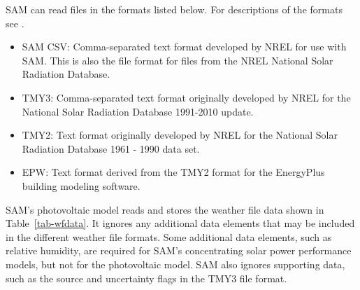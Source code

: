 \documentclass[12pt,letterpaper]{article}
\begin{document}
SAM can read files in the formats listed below. For descriptions of the formats see \citep{help-weatherfileformats}.

\begin{itemize}
\item SAM CSV: Comma-separated text format developed by NREL for use with SAM. This is also the file format for files from the NREL National Solar Radiation Database.
\item TMY3: Comma-separated text format originally developed by NREL for the National Solar Radiation Database 1991-2010 update.
\item TMY2: Text format originally developed by NREL for the National Solar Radiation Database 1961 - 1990 data set.
\item EPW: Text format derived from the TMY2 format for the EnergyPlus building modeling software. 
\end{itemize}

SAM's photovoltaic model reads and stores the weather file data shown in Table~\ref{tab-wfdata}. It ignores any additional data elements that may be included in the different weather file formats. Some additional data elements, such as relative humidity, are required for SAM's concentrating solar power performance models, but not for the photovoltaic model. SAM also ignores supporting data, such as the source and uncertainty flags in the TMY3 file format.
\end{document}
